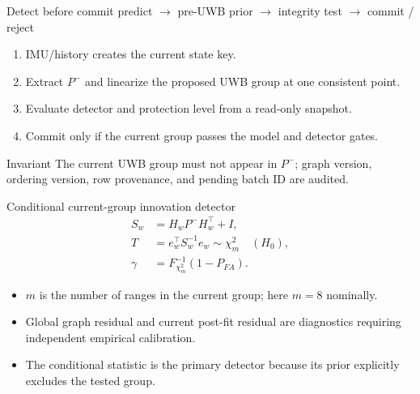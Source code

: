 \documentclass[aspectratio=169,10pt]{beamer}
\begin{document}
\begin{frame}{Detect before commit}
\centering
\Large
\textcolor{FullBlue}{predict} $\rightarrow$
\textcolor{FullBlue}{pre-UWB prior} $\rightarrow$
\textcolor{GoodGreen}{integrity test} $\rightarrow$
\textcolor{FaultRed}{commit / reject}
\vspace{1em}
\normalsize
\begin{enumerate}
\item IMU/history creates the current state key.
\item Extract $P^-$ and linearize the proposed UWB group at one consistent point.
\item Evaluate detector and protection level from a read-only snapshot.
\item Commit only if the current group passes the model and detector gates.
\end{enumerate}
\begin{alertblock}{Invariant}
The current UWB group must not appear in $P^-$; graph version, ordering version, row provenance, and pending batch ID are audited.
\end{alertblock}
\end{frame}

\begin{frame}{Conditional current-group innovation detector}
\begin{align*}
S_w &= H_wP^-H_w^\top+I,\\
T &= e_w^\top S_w^{-1}e_w \sim \chi_m^2 \quad (H_0),\\
\gamma &= F^{-1}_{\chi_m^2}(1-P_{FA}).
\end{align*}
\begin{itemize}
\item $m$ is the number of ranges in the current group; here $m=8$ nominally.
\item Global graph residual and current post-fit residual are diagnostics requiring independent empirical calibration.
\item The conditional statistic is the primary detector because its prior explicitly excludes the tested group.
\end{itemize}
\end{frame}
\end{document}
